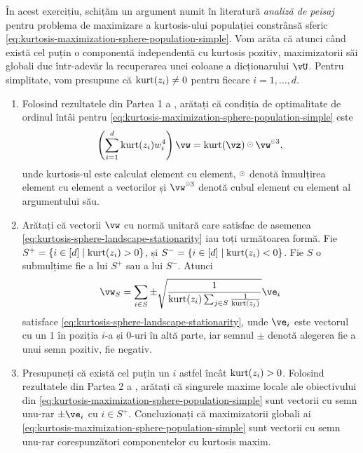 \documentclass[../../book-main_ro.tex]{subfiles}
\begin{document}
\begin{exercise}\label{exercise:kurtosis-sphere-landscape}
    În acest exercițiu, schițăm un argument numit în literatură \textit{analiză de peisaj} pentru problema de maximizare a kurtosis-ului populației constrânsă sferic \eqref{eq:kurtosis-maximization-sphere-population-simple}. Vom arăta că atunci când există cel puțin o componentă independentă cu kurtosis pozitiv,
    maximizatorii săi globali duc într-adevăr la recuperarea unei coloane a dicționarului $\vU$.
    Pentru simplitate, vom presupune că $\mathop{\mathrm{kurt}}(z_i) \neq 0$ pentru fiecare $i = 1, \dots, d$.
    \begin{enumerate}
        \item Folosind rezultatele din Partea 1 a ,
        arătați că condiția de optimalitate de ordinul întâi pentru \eqref{eq:kurtosis-maximization-sphere-population-simple} este
        \begin{equation}\label{eq:kurtosis-sphere-landscape-stationarity}
            \left(\sum_{i=1}^d \kurt(z_i) w_i^4 \right) 
            \vw = \kurt(\vz) \hada \vw^{\hada 3}, 
        \end{equation}
        unde kurtosis-ul este calculat element cu element, $\hada$ denotă înmulțirea element cu element a vectorilor și $\vw^{\hada 3}$ denotă cubul element cu element al argumentului său.
        \item Arătați că vectorii $\vw$ cu normă unitară care satisfac de asemenea \eqref{eq:kurtosis-sphere-landscape-stationarity}
        iau toți următoarea formă.
        Fie $S^+ = \set{i \in [d] \given \kurt(z_i) > 0}$, și
        $S^- = \set{i \in [d] \given \kurt(z_i) < 0}$.
        Fie $S$ o submulțime fie a lui $S^+$ sau a lui $S^-$.
        Atunci
        \begin{equation}\label{eq:kurtosis-sphere-landscape-cps}
            \vw_S = \sum_{i \in S} \pm \sqrt{\frac{1}{\kurt(z_i) \sum_{j \in S} \frac{1}{\kurt(z_j)}}} \ve_i
        \end{equation}
        satisface \eqref{eq:kurtosis-sphere-landscape-stationarity},
        unde $\ve_i$ este vectorul cu un $1$ în poziția $i$-a și $0$-uri în altă parte, iar semnul $\pm$ denotă alegerea fie a unui semn pozitiv, fie negativ.
        \item Presupuneți că există cel puțin un $i$ astfel încât $\mathop{\mathrm{kurt}}(z_i) > 0$. Folosind rezultatele din Partea 2 a , arătați că singurele maxime locale ale obiectivului din \eqref{eq:kurtosis-maximization-sphere-population-simple} sunt vectorii cu semn unu-rar $\pm \ve_i$ cu $i \in S^+$. Concluzionați că maximizatorii globali ai \eqref{eq:kurtosis-maximization-sphere-population-simple} sunt vectorii cu semn unu-rar corespunzători componentelor cu kurtosis maxim. %

\end{enumerate}
\end{exercise}
\end{document}
